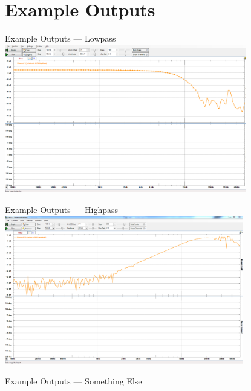 \documentclass{beamer}
\begin{document}
\section{Example Outputs}
\begin{frame}{Example Outputs --- Lowpass}
  \includegraphics[height=6.5cm]
                  {very-nice-8th-order-lowpass.png}
\end{frame}
\begin{frame}{Example Outputs --- Highpass}
  \includegraphics[height=6.5cm]
                  {iir-highpass-test2.png}
\end{frame}
\begin{frame}{Example Outputs --- Something Else}
\end{frame}
\end{document}
